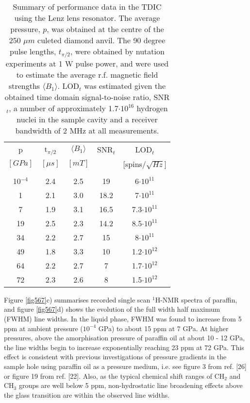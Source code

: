 \documentclass[aip,rsi,reprint,graphicx]{revtex4-1} %
\begin{document}
\begin{table}
\begin{tabular}{ccccc}
p&t$_{\pi/2}$&$\langle B_1\rangle$&SNR$_t$&LOD$_t$\\
$[GPa]$&$[\mu s]$&$[mT]$& &[spins/$\sqrt{Hz}$] \\
\hline\\
\vspace{.3em}
10$^{-4}$&2.4&2.5&19&6$\cdot10^{11}$ \\ 
\vspace{.3em}
1&2.1&3.0&18.2&7$\cdot10^{11}$ \\ 
\vspace{.3em}
7&1.9&3.1&16.5&7.3$\cdot10^{11}$\\ 
\vspace{.3em}
19&2.5&2.3&14.2&8.5$\cdot10^{11}$ \\ 
\vspace{.3em}
34&2.2&2.7&15&8$\cdot10^{11}$ \\
\vspace{.3em}
49&1.8&3.3&10&1.2$\cdot10^{12}$\\
\vspace{.3em}
64&2.2&2.7&7&1.7$\cdot10^{12}$\\
\vspace{.3em}
72&2.3&2.6&8&1.5$\cdot10^{12}$
\end{tabular}
\caption{\label{table1} Summary of performance data in the TDIC using the Lenz lens resonator. The average pressure, $p$, was obtained at the centre of the 250 $\mu m$ culeted diamond anvil. The 90 degree pulse lengths, $t_{\pi/2}$, were obtained by nutation experiments at 1 W pulse power, and were used to estimate the average r.f. magnetic field strengths $\langle B_1\rangle$. LOD$_t$ was estimated given the obtained time domain signal-to-noise ratio, SNR$_t$, a number of approximately 1.7$\cdot10^{16}$ hydrogen nuclei in the sample cavity and a receiver bandwidth of 2 MHz at all measurements.}
\end{table}
Figure \ref{fig567}c) summarises recorded single scan $^1$H-NMR spectra of paraffin, and figure \ref{fig567}d) shows the evolution of the full width half maximum (FWHM) line widths. In the liquid phase, FWHM was found to increase from 5 ppm at ambient pressure ($10^{-4}$ GPa) to about 15 ppm at 7 GPa. At higher pressures, above the amorphisation pressure of paraffin oil\cite{Otto1998, Tateiwa2009, Tateiwa2010} at about 10 \-- 12 GPa, the line widths begin to increase exponentially reaching 23 ppm at 72 GPa. This effect is consistent with previous investigations of pressure gradients in the sample hole using paraffin oil as a pressure medium, i.e. see figure 3 from ref. [26]\cite{Meier2015a}  or figure 19 from ref. [22]\cite{Meier2017}. Also, as the typical chemical shift ranges of CH$_2$ and CH$_3$ groups are well below 5 ppm\cite{Boschke1983}, non-hydrostatic line broadening effects above the glass transition are within the observed line widths.\\
\end{document}
